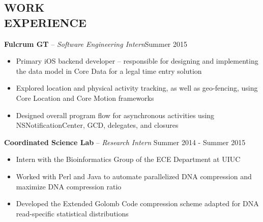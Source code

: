 \documentclass[resmargin]{res}
\begin{document}
\begin{resume}
\vspace{-3mm}
\section{WORK \\ EXPERIENCE} 
{\bf Fulcrum GT} -- {\sl Software Engineering Intern}\hfill Summer 2015
	\begin{itemize} \itemsep -2pt
	\item Primary iOS backend developer -- responsible for designing and implementing the data model in Core Data for a legal time entry solution
	\item Explored location and physical activity tracking, as well as geo-fencing, using Core Location and Core Motion frameworks
	\item Designed overall program flow for asynchronous activities using NSNotificationCenter, GCD, delegates, and closures
	\end{itemize}
\vspace{-4mm}
{\bf Coordinated Science Lab} -- {\sl Research Intern }\hfill Summer 2014 - Summer 2015
                 \begin{itemize}  \itemsep -2pt %
                 \item Intern with the Bioinformatics Group of the ECE Department at UIUC 
                 \item Worked with Perl and Java to automate parallelized DNA 
                 {\mbox compression} and maximize DNA compression ratio
                 \item Developed the Extended Golomb Code compression scheme adapted for DNA read-specific statistical distributions
                \end{itemize}
 
\vspace{-4mm}

\end{resume}
\end{document}
